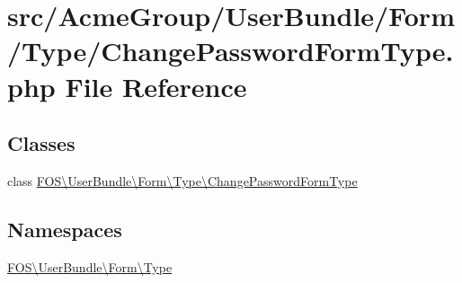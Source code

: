 \hypertarget{_change_password_form_type_8php}{\section{src/\+Acme\+Group/\+User\+Bundle/\+Form/\+Type/\+Change\+Password\+Form\+Type.php File Reference}
\label{_change_password_form_type_8php}
}
\subsection*{Classes}
\begin{DoxyCompactItemize}
\item 
class \hyperlink{class_f_o_s_1_1_user_bundle_1_1_form_1_1_type_1_1_change_password_form_type}{F\+O\+S\textbackslash{}\+User\+Bundle\textbackslash{}\+Form\textbackslash{}\+Type\textbackslash{}\+Change\+Password\+Form\+Type}
\end{DoxyCompactItemize}
\subsection*{Namespaces}
\begin{DoxyCompactItemize}
\item 
 \hyperlink{namespace_f_o_s_1_1_user_bundle_1_1_form_1_1_type}{F\+O\+S\textbackslash{}\+User\+Bundle\textbackslash{}\+Form\textbackslash{}\+Type}
\end{DoxyCompactItemize}
